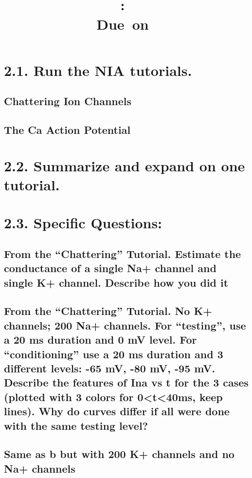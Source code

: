 \documentclass[11pt]{modart}
\title{\large{\hmwkAuthorName}\vspace{0.1in}\\\textmd{\textbf{\hmwkClass:\ \hmwkTitle}}\\\normalsize\vspace{0.1in}\small{Due\ on\ \hmwkDueDate}\\\vspace{0.1in}\large{\textit{\hmwkClassInstructor}}\vspace{0.5in}}
\author{}
\date{}
\begin{document}
\maketitle

\section{2.1. Run the NIA tutorials.}
\subsection{Chattering Ion Channels}
\subsection{The Ca Action Potential}
\section{2.2. Summarize and expand on one tutorial.}
\section{2.3. Specific Questions:}
\subsection{From the “Chattering” Tutorial.  Estimate the conductance of a single Na+ 
channel and single K+ channel.  Describe how you did it}
\subsection{From the “Chattering” Tutorial.  No K+ channels; 200 Na+ channels.  For 
“testing”, use a 20 ms duration and 0 mV level.  For “conditioning” use a 20 ms 
duration and 3 different levels:  -65 mV, -80 mV, -95 mV.  Describe the features 
of Ina vs t for the 3 cases (plotted with 3 colors for 0<t<40ms, keep lines).  Why 
do curves differ if all were done with the same testing level?}
\subsection{Same as b but with 200 K+ channels and no Na+ channels}
\end{document}
